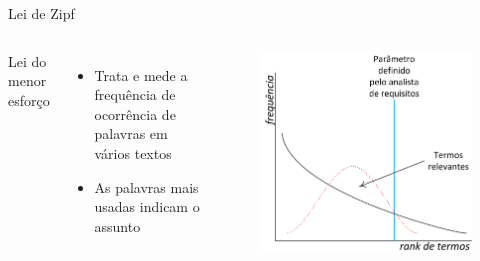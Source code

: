 \begin{frame}{Lei de Zipf}

	\begin{columns}
		Lei do menor esforço
		\begin{itemize}
			\item Trata e mede a frequência de ocorrência de palavras em vários textos
			\item As palavras mais usadas indicam o assunto
		\end{itemize}
		\begin{figure}[hb]
			\includegraphics[width=1\textwidth]{figures/zipflunh.png}
		\end{figure}
	\end{columns}

\end{frame}

